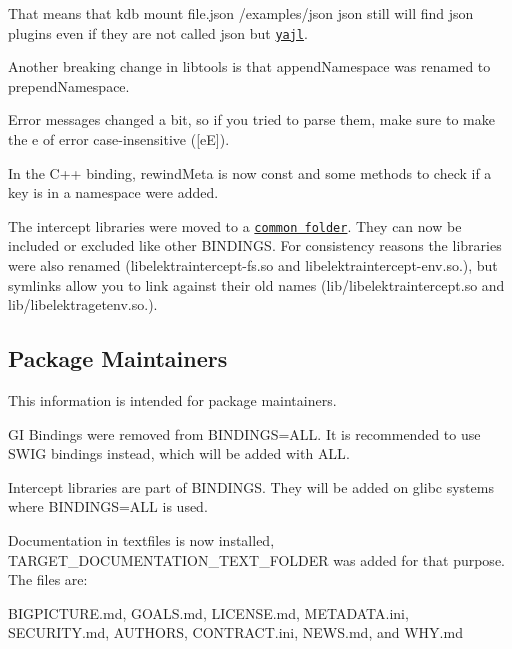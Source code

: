 That means that {\ttfamily kdb mount file.\+json /examples/json json} still will find {\ttfamily json} plugins even if they are not called {\ttfamily json} but \href{https://master.libelektra.org/src/plugins/yajl}{\tt yajl}.

Another breaking change in {\ttfamily libtools} is that {\ttfamily append\+Namespace} was renamed to {\ttfamily prepend\+Namespace}.

Error messages changed a bit, so if you tried to parse them, make sure to make the {\ttfamily e} of error case-\/insensitive ({\ttfamily \mbox{[}eE\mbox{]}}).

In the C++ binding, {\ttfamily rewind\+Meta} is now {\ttfamily const} and some methods to check if a key is in a namespace were added.

The intercept libraries were moved to a \href{https://master.libelektra.org/src/bindings/intercept}{\tt common folder}. They can now be included or excluded like other {\ttfamily B\+I\+N\+D\+I\+N\+GS}. For consistency reasons the libraries were also renamed ({\ttfamily libelektraintercept-\/fs.\+so} and {\ttfamily libelektraintercept-\/env.\+so.}), but symlinks allow you to link against their old names ({\ttfamily lib/libelektraintercept.\+so} and {\ttfamily lib/libelektragetenv.\+so.}).

\subsection*{Package Maintainers}

This information is intended for package maintainers.


\begin{DoxyItemize}
\item GI Bindings were removed from {\ttfamily B\+I\+N\+D\+I\+N\+GS=A\+LL}. It is recommended to use {\ttfamily S\+W\+IG} bindings instead, which will be added with {\ttfamily A\+LL}.
\item Intercept libraries are part of {\ttfamily B\+I\+N\+D\+I\+N\+GS}. They will be added on glibc systems where {\ttfamily B\+I\+N\+D\+I\+N\+GS=A\+LL} is used.
\item Documentation in textfiles is now installed, {\ttfamily T\+A\+R\+G\+E\+T\+\_\+\+D\+O\+C\+U\+M\+E\+N\+T\+A\+T\+I\+O\+N\+\_\+\+T\+E\+X\+T\+\_\+\+F\+O\+L\+D\+ER} was added for that purpose. The files are\+:
\begin{DoxyItemize}
\item {\ttfamily B\+I\+G\+P\+I\+C\+T\+U\+R\+E.\+md}, {\ttfamily G\+O\+A\+L\+S.\+md}, {\ttfamily L\+I\+C\+E\+N\+S\+E.\+md}, {\ttfamily M\+E\+T\+A\+D\+A\+T\+A.\+ini}, {\ttfamily S\+E\+C\+U\+R\+I\+T\+Y.\+md}, {\ttfamily A\+U\+T\+H\+O\+RS}, {\ttfamily C\+O\+N\+T\+R\+A\+C\+T.\+ini}, {\ttfamily N\+E\+W\+S.\+md}, and {\ttfamily W\+H\+Y.\+md}
\end{DoxyItemize}
\end{DoxyItemize}

